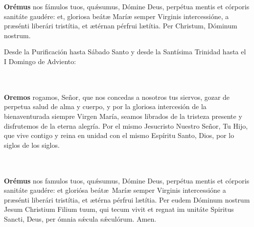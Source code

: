\documentclass[10pt,a4paper,oneside]{book}
\begin{document}
\begin{minipage}[t]{0.475\textwidth}
      \textbf{Orémus}
       nos fámulos tuos, qu{\'\ae}sumus, Dómine Deus, perpétua mentis et córporis sanitáte gaudére: et, gloriosa beát{\ae}
      Marí{\ae} semper Virginis intercessióne, a pr{\ae}sénti liberári tristítia, et {\ae}térnan pérfrui l{\ae}títia. Per Christum, Dóminum nostrum.
      \\
\end{minipage}

\newpage

\noindent\small{Desde la Purificación hasta Sábado Santo y desde la Santísima Trinidad hasta el I Domingo de Adviento:}\\
\begin{minipage}[t]{0.475\textwidth}
      \ruegapornosotrossalve\\\\
      \textbf{Oremos}
       rogamos, Señor, que nos concedas a nosotros tus siervos, gozar de perpetua salud de alma y cuerpo, y por la gloriosa intercesión de la bienaventurada siempre Virgen
      María, seamos librados de la tristeza presente y disfrutemos de la eterna alegría. Por el mismo Jesucristo Nuestro Señor, Tu Hijo, que vive contigo y reina en unidad con el mismo Espíritu
      Santo, Dios, por lo siglos de los siglos.
\end{minipage}
\begin{minipage}[t]{0.475\textwidth}
      \orapronobissalve\\\\
      \textbf{Orémus}
       nos famulos tuos, qu{\'\ae}sumus, Dómine Deus, perpétua mentis et córporis sanitáte gaudére: et gloriósa beát{\ae}\ Marí{\ae} semper Virginis intercessióne
      a pr{\ae}sénti liberári tristítia, et {\ae}térna pérfrui l{\ae}títia. Per eudem Dóminum nostrum Jesum Christium Filium tuum, qui tecum vivit et regnat im unitáte Spiritus Sancti,
      Deus, per ómnia s{\'\ae}cula s{\'\ae}culórum. Amen.\\
\end{minipage}

\bigskip
\end{document}
